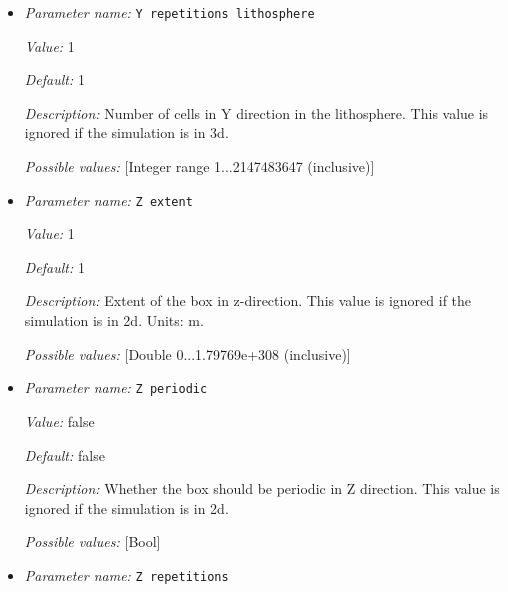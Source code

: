 \begin{itemize}
{\it Default:} 1


{\it Description:} Number of cells in Y direction of the lower box. If the simulation is in 3d, the same number of repetitions will be used in the upper box.


{\it Possible values:} [Integer range 1...2147483647 (inclusive)]
\item {\it Parameter name:} {\tt Y repetitions lithosphere}
\label{parameters:Geometry model/Box with lithosphere boundary indicators/Y repetitions lithosphere}


{\it Value:} 1


{\it Default:} 1


{\it Description:} Number of cells in Y direction in the lithosphere. This value is ignored if the simulation is in 3d.


{\it Possible values:} [Integer range 1...2147483647 (inclusive)]
\item {\it Parameter name:} {\tt Z extent}
\label{parameters:Geometry model/Box with lithosphere boundary indicators/Z extent}


{\it Value:} 1


{\it Default:} 1


{\it Description:} Extent of the box in z-direction. This value is ignored if the simulation is in 2d. Units: m.


{\it Possible values:} [Double 0...1.79769e+308 (inclusive)]
\item {\it Parameter name:} {\tt Z periodic}
\label{parameters:Geometry model/Box with lithosphere boundary indicators/Z periodic}


{\it Value:} false


{\it Default:} false


{\it Description:} Whether the box should be periodic in Z direction. This value is ignored if the simulation is in 2d.


{\it Possible values:} [Bool]
\item {\it Parameter name:} {\tt Z repetitions}
\label{parameters:Geometry model/Box with lithosphere boundary indicators/Z repetitions}



\end{itemize}
